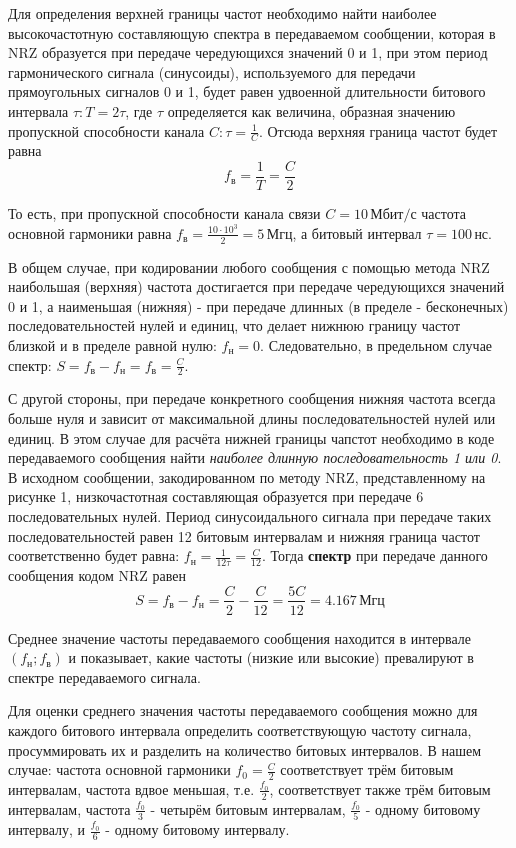 Для определения верхней границы частот необходимо найти наиболее высокочастотную составляющую спектра в передаваемом сообщении, которая в NRZ образуется при передаче чередующихся значений 0 и 1, при этом период гармонического сигнала (синусоиды), используемого для передачи прямоугольных сигналов 0 и 1, будет равен удвоенной длительности битового интервала $\tau: T = 2\tau$, где $\tau$ определяется как величина, образная значению пропускной способности канала $C: \tau = \frac{1}{C}$. Отсюда верхняя граница частот будет равна \[f_{\text{в}} = \frac{1}{T} = \frac{C}{2}\]

То есть, при пропускной способности канала связи $C = 10 \, \text{Мбит/с}$ частота основной гармоники равна $f_{\text{в}} = \frac{10 \cdot 10^3}{2} = 5 \, \text{Мгц}$, а битовый интервал $\tau = 100 \, \text{нс}$.

В общем случае, при кодировании любого сообщения с помощью метода NRZ наибольшая (верхняя) частота достигается при передаче чередующихся значений 0 и 1, а наименьшая (нижняя) - при передаче длинных (в пределе - бесконечных) последовательностей нулей и единиц, что делает нижнюю границу частот близкой и в пределе равной нулю: $f_{\text{н}} = 0$. Следовательно, в предельном случае спектр: $S = f_{\text{в}} - f_{\text{н}} = f_{\text{в}} = \frac{C}{2}$.

С другой стороны, при передаче конкретного сообщения нижняя частота всегда больше нуля и зависит от максимальной длины последовательностей нулей или единиц. В этом случае для расчёта нижней границы чапстот необходимо в коде передаваемого сообщения найти \textit{наиболее длинную последовательность 1 или 0}. В исходном сообщении, закодированном по методу NRZ, представленному на рисунке 1, низкочастотная составляющая образуется при передаче 6 последовательных нулей. Период синусоидального сигнала при передаче таких последовательностей равен 12 битовым интервалам и нижняя граница частот соответственно будет равна: $f_{\text{н}} = \frac{1}{12\tau} = \frac{C}{12}$. Тогда \textbf{спектр} при передаче данного сообщения кодом NRZ равен
\[
	S =  f_{\text{в}} - f_{\text{н}} = \frac{C}{2} - \frac{C}{12} = \frac{5C}{12} = 4.167 \, \text{Мгц}
\]

Среднее значение частоты передаваемого сообщения находится в интервале $(f_{\text{н}};f_{\text{в}})$ и показывает, какие частоты (низкие или высокие) превалируют в спектре передаваемого сигнала.

Для оценки среднего значения частоты передаваемого сообщения можно для каждого битового интервала определить соответствующую частоту сигнала, просуммировать их и разделить на количество битовых интервалов. В нашем случае: частота основной гармоники $f_0 = \frac{C}{2}$ соответствует трём битовым интервалам, частота вдвое меньшая, т.е. $\frac{f_0}{2}$, соответствует также трём битовым интервалам, частота $\frac{f_0}{3}$ - четырём битовым интервалам, $\frac{f_0}{5}$ - одному битовому интервалу, и $\frac{f_0}{6}$ - одному битовому интервалу.

